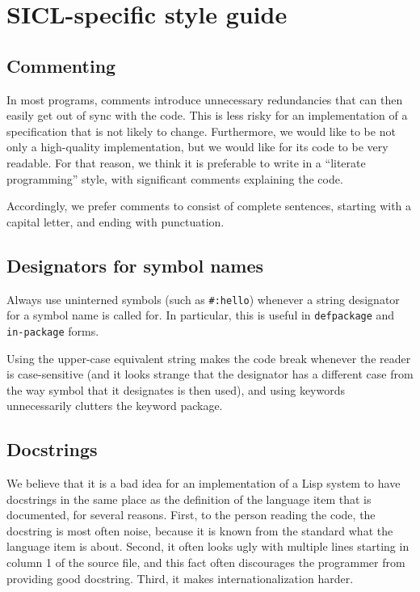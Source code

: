 \chapter{SICL-specific style guide}

\section{Commenting}

In most programs, comments introduce unnecessary redundancies that can
then easily get out of sync with the code.  This is less risky for an
implementation of a specification that is not likely to change.
Furthermore, we would like \sysname{} to be not only a high-quality
implementation, but we would like for its code to be very readable.
For that reason, we think it is preferable to write \sysname{} in a
``literate programming'' style, with significant comments explaining
the code. 

Accordingly, we prefer comments to consist of complete sentences,
starting with a capital letter, and ending with punctuation.

\section{Designators for symbol names}

Always use uninterned symbols (such as \texttt{\#:hello}) whenever a
string designator for a symbol name is called for.  In particular,
this is useful in \texttt{defpackage} and \texttt{in-package} forms.

Using the upper-case equivalent string makes the code break whenever
the reader is case-sensitive (and it looks strange that the designator
has a different case from the way symbol that it designates is then
used), and using keywords unnecessarily clutters the keyword package.

\section{Docstrings}

We believe that it is a bad idea for an implementation of a Lisp
system to have docstrings in the same place as the definition of the
language item that is documented, for several reasons.  First, to the
person reading the code, the docstring is most often noise, because it
is known from the standard what the language item is about.  Second,
it often looks ugly with multiple lines starting in column 1 of the
source file, and this fact often discourages the programmer from
providing good docstring.  Third, it makes internationalization
harder.

